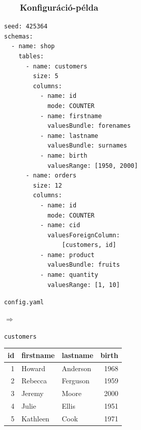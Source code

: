 \documentclass[
]{beamer}
\newcommand{\slidetitle}[2]{\frametitle{{\small #1 ~ \ding{226} ~ } \normalsize \textbf{#2} }}
\begin{document}
\begin{frame}[fragile]
    \slidetitle{\sectionshorttitle}{Konfiguráció-példa}
    
    \centering
    
    \begin{minipage}[c]{0.47\textwidth}
        \centering
        
        \begin{verbatim}
seed: 425364
schemas:
  - name: shop
    tables:
      - name: customers
        size: 5
        columns:
          - name: id
            mode: COUNTER
          - name: firstname
            valuesBundle: forenames
          - name: lastname
            valuesBundle: surnames
          - name: birth
            valuesRange: [1950, 2000]
      - name: orders
        size: 12
        columns:
          - name: id
            mode: COUNTER
          - name: cid
            valuesForeignColumn:
                [customers, id]
          - name: product
            valuesBundle: fruits
          - name: quantity
            valuesRange: [1, 10]
        \end{verbatim}
        
        {\footnotesize\texttt{config.yaml}} \pause
    \end{minipage}%
    \hspace*{\fill}
    \begin{minipage}[c]{0.35cm}
        {\Large $\Rightarrow$}
    \end{minipage}%
    \hspace*{\fill}
    \begin{minipage}[c]{0.45\textwidth}
        
        \centering
        
        \normalsize \texttt{customers}
        \vspace{0.1cm}
        
        \tiny
        \begin{tabular}{ |r|l|l|r| }
        \hline
           id & firstname & lastname & birth \\
        \hline
            1 & Howard & Anderson & 1968 \\
            2 & Rebecca & Ferguson & 1959 \\
            3 & Jeremy & Moore & 2000 \\
            4 & Julie & Ellis & 1951 \\
            5 & Kathleen & Cook & 1971 \\
        \hline
        \end{tabular}
        

\end{minipage}
\end{frame}
\end{document}
